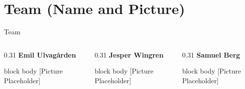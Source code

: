 \documentclass[aspectratio=169]{beamer}
\begin{document}
\section{Team (Name and Picture)}
\begin{frame}{Team}
    \begin{columns}[t]
        \begin{column}{0.31\textwidth}
            \centering
            \textbf{Emil Ulvagården}\\
            \vspace{0.3cm}
            \begin{beamercolorbox}[center,rounded=true,sep=0.3cm]{block body}
                \color{DarkSlate!60}\vspace{0.5cm}
                [Picture\\Placeholder]
                \vspace{0.5cm}
            \end{beamercolorbox}
        \end{column}

        \begin{column}{0.31\textwidth}
            \centering
            \textbf{Jesper Wingren}\\
            \vspace{0.3cm}
            \begin{beamercolorbox}[center,rounded=true,sep=0.3cm]{block body}
                \color{DarkSlate!60}\vspace{0.5cm}
                [Picture\\Placeholder]
                \vspace{0.5cm}
            \end{beamercolorbox}
        \end{column}

        \begin{column}{0.31\textwidth}
            \centering
            \textbf{Samuel Berg}\\
            \vspace{0.3cm}
            \begin{beamercolorbox}[center,rounded=true,sep=0.3cm]{block body}
                \color{DarkSlate!60}\vspace{0.5cm}
                [Picture\\Placeholder]
                \vspace{0.5cm}
            \end{beamercolorbox}
        \end{column}
    \end{columns}
\end{frame}
\end{document}
